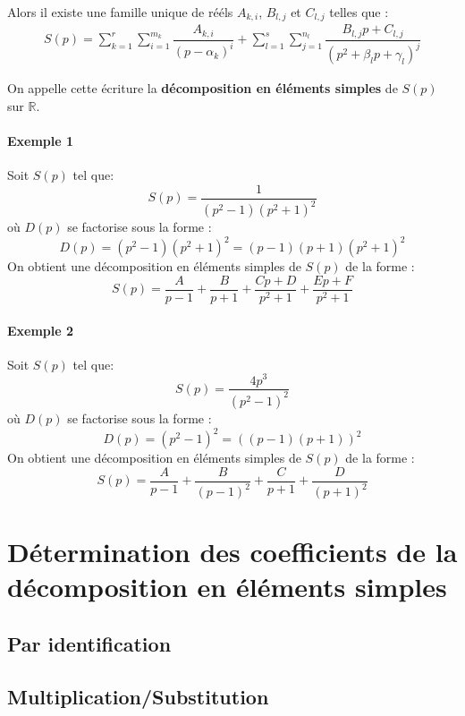 Alors il existe une famille unique de rééls $A_{k,i}$, $B_{l,j}$ et $C_{l,j}$ telles que :
\begin{align}
S(p)=\sum_{k=1}^r\sum_{i=1}^{m_k} \dfrac{A_{k,i}}{\left(p-\alpha_k\right)^i}+\sum_{l=1}^s\sum_{j=1}^{n_l} \dfrac{B_{l,j}p+C_{l,j}}{\left(p^2+\beta_lp+\gamma_l\right)^j}
\end{align}

On appelle cette écriture la \textbf{décomposition en éléments simples} de $S(p)$ sur $\mathbb{R}$.

\paragraph{Exemple 1}
Soit $S(p)$ tel que:
$$
S(p)=\dfrac{1}{(p^2-1)(p^2+1)^2}
$$
où $D(p)$ se factorise sous la forme :
$$
D(p)=(p^2-1)(p^2+1)^2=(p-1)(p+1)(p^2+1)^2
$$
On obtient une décomposition en éléments simples de $S(p)$ de la forme :
$$
S(p)=\dfrac{A}{p-1}+\dfrac{B}{p+1}+\dfrac{Cp+D}{p^2+1}+\dfrac{Ep+F}{p^2+1}
$$

\paragraph{Exemple 2}
Soit $S(p)$ tel que:
$$
S(p)=\dfrac{4p^3}{(p^2-1)^2}
$$
où $D(p)$ se factorise sous la forme :
$$
D(p)=(p^2-1)^2=\left((p-1)(p+1)\right)^2
$$
On obtient une décomposition en éléments simples de $S(p)$ de la forme :
$$
S(p)=\dfrac{A}{p-1}+\dfrac{B}{(p-1)^2}+\dfrac{C}{p+1}+\dfrac{D}{(p+1)^2}
$$
\section[Détermination des coefficients de la DES]{Détermination des coefficients de la décomposition en éléments simples}
\acpl
\subsection{Par identification}
\acpl
\subsection{Multiplication/Substitution}
\acpl
